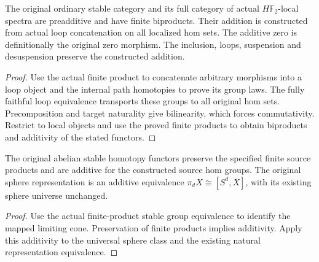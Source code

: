 \begin{proposition}
  \leanok
  The original ordinary stable category and its full category of actual $H\mathbb F_2$-local spectra are preadditive and have finite biproducts. Their addition is constructed from actual loop concatenation on all localized hom sets. The additive zero is definitionally the original zero morphism. The inclusion, loops, suspension and desuspension preserve the constructed addition.
\end{proposition}
\begin{proof}
  Use the actual finite product to concatenate arbitrary morphisms into a loop object and the internal path homotopies to prove its group laws. The fully faithful loop equivalence transports these groups to all original hom sets. Precomposition and target naturality give bilinearity, which forces commutativity. Restrict to local objects and use the proved finite products to obtain biproducts and additivity of the stated functors.
  \leanok
\end{proof}

\begin{proposition}
  \label{prop:actual-stable-functor-and-sphere-additivity}
  \leanok
  The original abelian stable homotopy functors preserve the specified finite source products and are additive for the constructed source hom groups. The original sphere representation is an additive equivalence $\pi_d X\cong[S^d,X]$, with its existing sphere universe unchanged.
\end{proposition}
\begin{proof}
  Use the actual finite-product stable group equivalence to identify the mapped limiting cone. Preservation of finite products implies additivity. Apply this additivity to the universal sphere class and the existing natural representation equivalence.
  \leanok
\end{proof}

